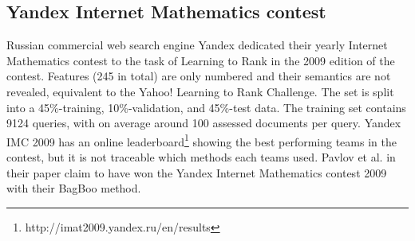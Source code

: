 \subsection{Yandex Internet Mathematics contest}
Russian commercial web search engine Yandex dedicated their yearly Internet Mathematics contest to the task of Learning to Rank in the 2009 edition of the contest. Features (245 in total) are only numbered and their semantics are not revealed, equivalent to the Yahoo! Learning to Rank Challenge. The set is split into a 45\%-training, 10\%-validation, and 45\%-test data. The training set contains 9124 queries, with on average around 100 assessed documents per query. Yandex IMC 2009 has an online leaderboard\footnote{http://imat2009.yandex.ru/en/results} showing the best performing teams in the contest, but it is not traceable which methods each teams used. Pavlov et al. \cite{Pavlov2010} in their paper claim to have won the Yandex Internet Mathematics contest 2009 with their BagBoo method.
